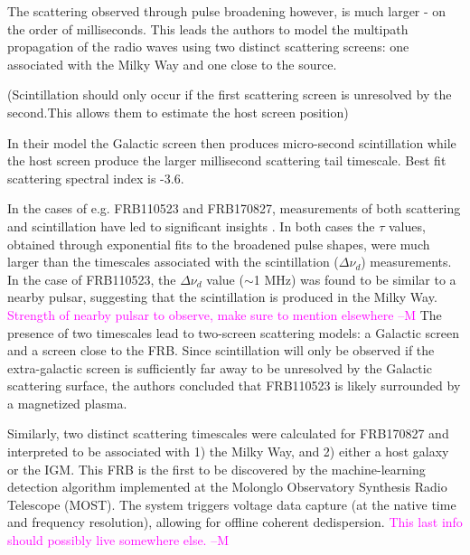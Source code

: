 \documentclass[a4paper,fleqn,usenatbib]{mnras}
\newcommand{\cM}[1]{\textcolor{magenta}{ #1 --M}}
\begin{document}
The scattering observed through pulse broadening however, is much larger - on
the order of milliseconds. This leads the authors to model the multipath
propagation of the radio waves using two distinct scattering screens: one
associated with the Milky Way and one close to the source. 

(Scintillation should only occur if the first scattering screen is unresolved by
the second.This allows them to estimate the host screen position)

In their model the Galactic screen then produces micro-second scintillation
while the host screen produce the larger millisecond scattering tail timescale.
Best fit scattering spectral index is -3.6. 

In the cases of e.g. FRB110523 and FRB170827, measurements of both scattering
and scintillation have led to significant insights
\citep{2015Natur.528..523M,2018arXiv180305697F}.  In both cases the $\tau$
values, obtained through exponential fits to the broadened pulse shapes, were
much larger than the timescales associated with the scintillation
($\Delta\nu_d$) measurements. In the case of FRB110523, the $\Delta\nu_d$ value
($\sim$1 MHz) was found to be similar to a nearby pulsar, suggesting that the
scintillation is produced in the Milky Way. \cM{Strength of nearby pulsar to
observe, make sure to mention elsewhere} The presence of two timescales lead to
two-screen scattering models: a Galactic screen and a screen close to the FRB.
Since scintillation will only be observed if the extra-galactic screen is
sufficiently far away to be unresolved by the Galactic scattering surface, the
authors concluded that FRB110523 is likely surrounded by a magnetized plasma. 

Similarly, two distinct scattering timescales were calculated for FRB170827 and
interpreted to be associated with 1) the Milky Way, and 2) either a host galaxy
or the IGM. This FRB is the first to be discovered by the machine-learning
detection algorithm implemented at the Molonglo Observatory Synthesis Radio
Telescope (MOST). The system triggers voltage data capture (at the native time
and frequency resolution), allowing for offline coherent dedispersion. \cM{This
last info should possibly live somewhere else.}

\end{document}
